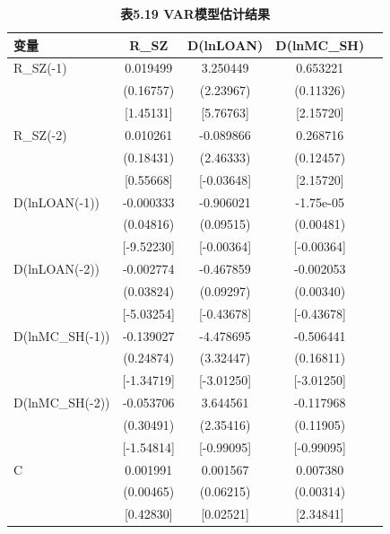 \documentclass[12pt, a4paper]{article}
\numberwithin{equation}{section}
\begin{document}
\begin{table}[h!]
    \centering
    \captionsetup{labelformat=empty}
    \caption{\textbf{\fontsize{9pt}{11pt}\selectfont 表5.19 VAR模型估计结果}}
    \begin{tabular}{lcccc}
        \toprule
        变量              & R\_SZ      & D(lnLOAN)  & D(lnMC\_SH) \\
        \midrule
        R\_SZ(-1)       & 0.019499   & 3.250449   & 0.653221    \\
                        & (0.16757)  & (2.23967)  & (0.11326)   \\
                        & [1.45131]  & [5.76763]  & [2.15720]   \\
        R\_SZ(-2)       & 0.010261   & -0.089866  & 0.268716    \\
                        & (0.18431)  & (2.46333)  & (0.12457)   \\
                        & [0.55668]  & [-0.03648] & [2.15720]   \\
        D(lnLOAN(-1))   & -0.000333  & -0.906021  & -1.75e-05   \\
                        & (0.04816)  & (0.09515)  & (0.00481)   \\
                        & [-9.52230] & [-0.00364] & [-0.00364]  \\
        D(lnLOAN(-2))   & -0.002774  & -0.467859  & -0.002053   \\
                        & (0.03824)  & (0.09297)  & (0.00340)   \\
                        & [-5.03254] & [-0.43678] & [-0.43678]  \\
        D(lnMC\_SH(-1)) & -0.139027  & -4.478695  & -0.506441   \\
                        & (0.24874)  & (3.32447)  & (0.16811)   \\
                        & [-1.34719] & [-3.01250] & [-3.01250]  \\
        D(lnMC\_SH(-2)) & -0.053706  & 3.644561   & -0.117968   \\
                        & (0.30491)  & (2.35416)  & (0.11905)   \\
                        & [-1.54814] & [-0.99095] & [-0.99095]  \\
        C               & 0.001991   & 0.001567   & 0.007380    \\
                        & (0.00465)  & (0.06215)  & (0.00314)   \\
                        & [0.42830]  & [0.02521]  & [2.34841]   \\
        \bottomrule
    \end{tabular}
\end{table}
\end{document}
